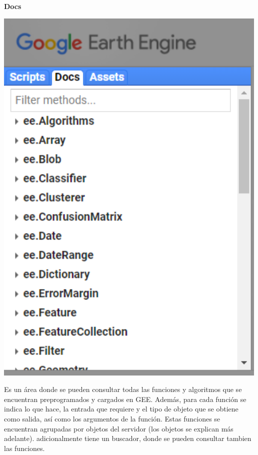 \documentclass[
]{article}
\begin{document}
\textbf{Docs}

\includegraphics[width=500px]{Img/docs}

Es un área donde se pueden consultar todas las funciones y algoritmos
que se encuentran preprogramados y cargados en GEE. Además, para cada
función se indica lo que hace, la entrada que requiere y el tipo de
objeto que se obtiene como salida, así como los argumentos de la
función. Estas funciones se encuentran agrupadas por objetos del
servidor (los objetos se explican más adelante). adicionalmente tiene un
buscador, donde se pueden consultar tambien las funciones.
\end{document}
